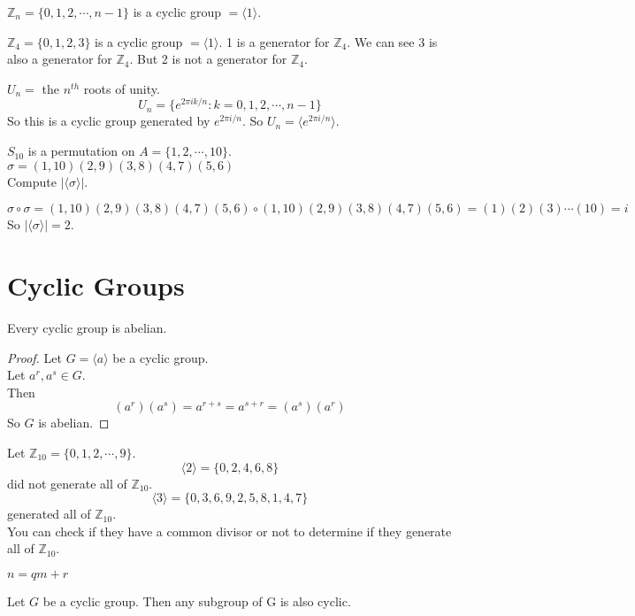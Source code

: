 \begin{eg}
    $\mathbb{Z}_n = \{0, 1, 2, \cdots, n-1\}$ is a cyclic group $= \langle 1 \rangle$.
\end{eg}

\begin{eg}
    $\mathbb{Z}_4 = \{0, 1, 2, 3\}$ is a cyclic group $= \langle 1 \rangle$. 1 is a generator for $\mathbb{Z}_4$.
    We can see 3 is also a generator for $\mathbb{Z}_4$. But 2 is not a generator for $\mathbb{Z}_4$.
\end{eg}

\begin{eg}
    $U_n = $ the $n^{th}$ roots of unity.\\
    \[U_n = \{e^{2\pi i k/n} : k = 0, 1, 2, \cdots, n-1\}\]
    So this is a cyclic group generated by $e^{2\pi i/n}$. So $U_n = \langle e^{2\pi i/n} \rangle$.
\end{eg}

\begin{exercise}
    $S_{10}$ is a permutation on $A = \{1, 2, \cdots, 10\}$.
    $\sigma = (1, 10)(2, 9)(3, 8)(4, 7)(5, 6)$\\
    Compute $|\langle \sigma \rangle|$.
\end{exercise}
\begin{answer}
    $\sigma \circ \sigma = (1, 10)(2, 9)(3, 8)(4, 7)(5, 6) \circ (1, 10)(2, 9)(3, 8)(4, 7)(5, 6) = (1)(2)(3)\cdots(10) = i$\\
    So $|\langle \sigma \rangle| = 2$. 
\end{answer}

\section{Cyclic Groups}
\begin{theorem}
    Every cyclic group is abelian.
\end{theorem}
\begin{proof}
    Let $G = \langle a \rangle$ be a cyclic group.\\
    Let $a^r, a^s \in G$.\\
    Then 
    \[(a^r)(a^s) = a^{r+s} = a^{s+r} = (a^s)(a^r)\]
    So $G$ is abelian.
\end{proof}

\begin{eg}
    Let $\mathbb{Z}_{10} = \{0, 1, 2, \cdots, 9\}$.\\
    \[\langle 2 \rangle = \{0, 2, 4, 6, 8\}\] did not generate all of $\mathbb{Z}_{10}$.\\
    \[\langle 3 \rangle = \{0, 3, 6, 9, 2, 5, 8, 1, 4, 7\}\] generated all of $\mathbb{Z}_{10}$.\\
    You can check if they have a common divisor or not to determine if they generate all of $\mathbb{Z}_{10}$.
\end{eg}

\begin{theorem}
    $n=qm+r$
\end{theorem}

\begin{theorem}
    Let $G$ be a cyclic group.
    Then any subgroup of G is also cyclic.
\end{theorem}

